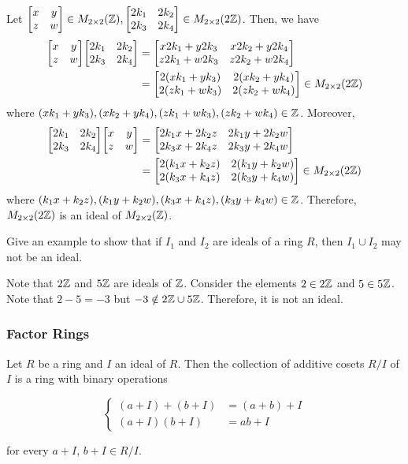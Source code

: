 \begin{solution}
\begin{enumerate}[(a)]
    Let $\mqty[x & y \\ z & w ] \in M_{2 \times 2} (\Z),  \mqty[2k_1 & 2k_2 \\ 2k_3 & 2k_4 ] \in M_{2 \times 2}(2\Z)$. Then, we have
    \begin{align*}
        \mqty[x & y \\ z & w ]  \mqty[2k_1 & 2k_2 \\ 2k_3 & 2k_4 ] &= \mqty[x2k_1 + y2k_3 & x2k_2 + y2k_4 \\ z2k_1 + w2k_3 & z2k_2 + w2k_4] \\
        &= \mqty[2(xk_1 + yk_3) & 2(xk_2 + yk_4) \\ 2(zk_1 + wk_3) & 2(zk_2 + wk_4)] \in M_{2 \times 2} (2\Z)
    \end{align*}
    where $(xk_1 + yk_3), (xk_2 + yk_4), (zk_1 + wk_3), (zk_2 + wk_4) \in \mathbb{Z}$. Moreover,
    \begin{align*}
        \mqty[2k_1 & 2k_2 \\ 2k_3 & 2k_4 ] \mqty[x & y \\ z & w ] &= \mqty[2k_1x + 2k_2z & 2k_1y + 2k_2w \\ 2k_3x + 2k_4z & 2k_3y + 2k_4w] \\
        &= \mqty[2(k_1x + k_2z) & 2(k_1y + k_2w) \\ 2(k_3x + k_4z) & 2(k_3y + k_4w)] \in M_{2 \times 2} (2\Z)
    \end{align*}
    where $(k_1x + k_2z), (k_1y + k_2w), (k_3x + k_4z), (k_3y + k_4w) \in \mathbb{Z}$. Therefore, $M_{2 \times 2} (2\mathbb{Z})$ is an ideal of $M_{2 \times 2} (\mathbb{Z})$.
\end{enumerate}

\end{solution}

\begin{exercise}
    Give an example to show that if $I_1$ and $I_2$ are ideals of a ring $R$, then $I_1 \cup I_2$ may not be an ideal.
\end{exercise}

\begin{solution}
    Note that $2\mathbb{Z}$ and $5\mathbb{Z}$ are ideals of $\mathbb{Z}$. Consider the elements $2 \in 2\mathbb{Z}$ and $5 \in 5\mathbb{Z}$. Note that $2 - 5 = -3$ but $-3 \notin 2\mathbb{Z} \cup 5\mathbb{Z}$. Therefore, it is not an ideal.
\end{solution}
\subsubsection{Factor Rings}

\begin{theorem}
    Let $R$ be a ring and $I$ an ideal of $R$. Then the collection of additive cosets $R/I$ of $I$ is a ring with binary operations
    
    \[
    \begin{cases}
        (a + I) + (b + I) &= (a + b) + I \\
        (a+I)(b+I) &= ab + I
    \end{cases}
    \]
    
    for every $a + I$, $b + I \in R/I$. 
\end{theorem}

